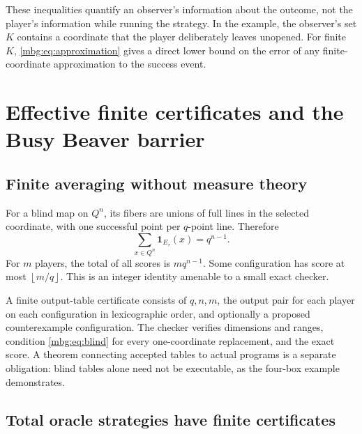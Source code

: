 \documentclass[11pt,letterpaper]{article}
\theoremstyle{definition}
\newcommand{\ind}{\mathbf 1}
\newcommand{\floor}[1]{\left\lfloor #1\right\rfloor}
\begin{document}
These inequalities quantify an observer's information about the outcome, not the player's information while running the strategy. In the example, the observer's set $K$ contains a coordinate that the player deliberately leaves unopened. For finite $K$, \eqref{mbg:eq:approximation} gives a direct lower bound on the error of any finite-coordinate approximation to the success event.

\section{Effective finite certificates and the Busy Beaver barrier}
\label{mbg:sec:computability}

\subsection{Finite averaging without measure theory}
For a blind map on $Q^n$, its fibers are unions of full lines in the selected coordinate, with one successful point per $q$-point line. Therefore
\begin{equation}
 \sum_{x\in Q^n}\ind_{E_\tau}(x)=q^{n-1}.
 \label{mbg:eq:finiteaverage}
\end{equation}
For $m$ players, the total of all scores is $mq^{n-1}$. Some configuration has score at most $\floor{m/q}$. This is an integer identity amenable to a small exact checker.

A finite output-table certificate consists of $q,n,m$, the output pair for each player on each configuration in lexicographic order, and optionally a proposed counterexample configuration. The checker verifies dimensions and ranges, condition \eqref{mbg:eq:blind} for every one-coordinate replacement, and the exact score. A theorem connecting accepted tables to actual programs is a separate obligation: blind tables alone need not be executable, as the four-box example demonstrates.

\subsection{Total oracle strategies have finite certificates}
\end{document}
